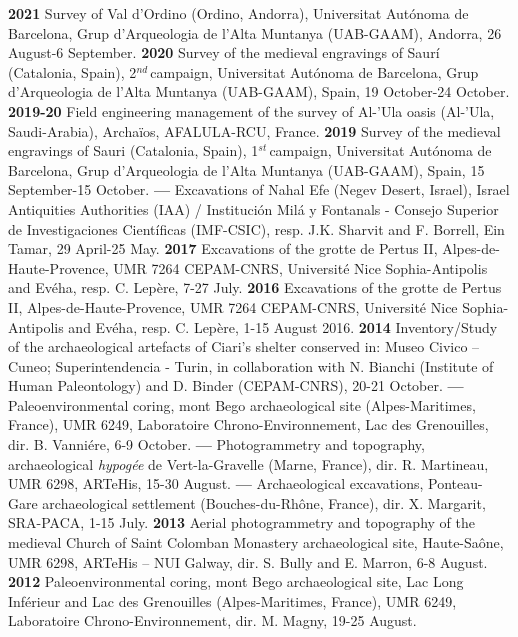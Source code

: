 \documentclass{article}
\begin{document}
\textbf{2021 }Survey of Val d'Ordino (Ordino, Andorra), Universitat Aut\'{o}noma de Barcelona, Grup d'Arqueologia de l'Alta Muntanya (UAB-GAAM), Andorra, 26 August-6 September.
\smallbreak
\textbf{2020 }Survey of the medieval engravings of Saur\'i (Catalonia, Spain), 2${}^{nd\ }$campaign, Universitat Aut\'{o}noma de Barcelona, Grup d'Arqueologia de l'Alta Muntanya (UAB-GAAM), Spain, 19 October-24 October.
\smallbreak
\textbf{2019-20 }Field engineering management of the survey of Al-'Ula oasis (Al-'Ula, Saudi-Arabia), Archa\"{i}os, AFALULA-RCU, France.
\smallbreak
\textbf{2019 }Survey of the medieval engravings of Sauri (Catalonia, Spain), 1${}^{st\ }$campaign, Universitat Aut\'{o}noma de Barcelona, Grup d'Arqueologia de l'Alta Muntanya (UAB-GAAM), Spain, 15 September-15 October.
\smallbreak
\textbf{--- }Excavations of Nahal Efe (Negev Desert, Israel), Israel Antiquities Authorities (IAA) / Instituci\'{o}n Mil\'{a} y Fontanals - Consejo Superior de Investigaciones Cient\'{i}ficas (IMF-CSIC), resp. J.K. Sharvit and F. Borrell, Ein Tamar, 29 April-25 May.
\smallbreak
\textbf{2017 }Excavations of the grotte de Pertus II, Alpes-de-Haute-Provence, UMR 7264 CEPAM-CNRS, Universit\'{e} Nice Sophia-Antipolis and Ev\'{e}ha, resp. C. Lep\`{e}re, 7-27 July.
\smallbreak
\textbf{2016 }Excavations of the grotte de Pertus II, Alpes-de-Haute-Provence, UMR 7264 CEPAM-CNRS, Universit\'{e} Nice Sophia-Antipolis and Ev\'{e}ha, resp. C. Lep\`{e}re, 1-15 August 2016.
\smallbreak
\textbf{2014 }Inventory/Study of the archaeological artefacts of Ciari's shelter conserved in: Museo Civico -- Cuneo; Superintendencia - Turin, in collaboration with N. Bianchi (Institute of Human Paleontology) and D. Binder (CEPAM-CNRS), 20-21 October.
\smallbreak
\textbf{--- }Paleoenvironmental coring, mont Bego archaeological site (Alpes-Maritimes, France), UMR 6249, Laboratoire Chrono-Environnement, Lac des Grenouilles, dir. B. Vanni\'{e}re, 6-9 October.
\smallbreak
\textbf{--- }Photogrammetry and topography, archaeological \textit{hypog\'{e}e} de Vert-la-Gravelle (Marne, France), dir. R. Martineau, UMR 6298, ARTeHis, 15-30 August.
\smallbreak
\textbf{--- }Archaeological excavations, Ponteau-Gare archaeological settlement (Bouches-du-Rh\^{o}ne, France), dir. X. Margarit, SRA-PACA, 1-15 July.\smallbreak
\textbf{2013 }Aerial\textbf{ }photogrammetry and topography of the medieval Church of Saint Colomban Monastery archaeological site, Haute-Sa\^{o}ne, UMR 6298, ARTeHis -- NUI Galway, dir. S. Bully and E. Marron, 6-8 August.
\smallbreak
\textbf{2012 }Paleoenvironmental coring, mont Bego archaeological site, Lac Long Inf\'{e}rieur and Lac des Grenouilles (Alpes-Maritimes, France), UMR 6249, Laboratoire Chrono-Environnement, dir. M. Magny, 19-25 August.
\end{document}
